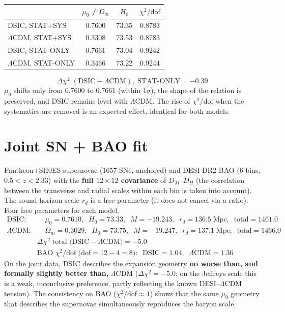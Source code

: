 \documentclass[a4paper,10pt]{article}
\begin{document}
\begin{table}[htbp]
\centering
\small
\begin{tabular}{@{}lccc@{}}
\toprule
 & $\mu_0$ / $\Omega_m$ & $H_0$ & $\chi^2/\text{dof}$ \\
\midrule
DSIC, STAT+SYS & 0.7600 & 73.35 & 0.8783 \\
$\Lambda$CDM, STAT+SYS & 0.3308 & 73.53 & 0.8783 \\
DSIC, STAT-ONLY & 0.7661 & 73.04 & 0.9242 \\
$\Lambda$CDM, STAT-ONLY & 0.3466 & 73.22 & 0.9244 \\
\bottomrule
\end{tabular}
\end{table}

\begin{equation*}
\Delta\chi^2\;(\text{DSIC} - \Lambda\text{CDM}),\;\text{STAT-ONLY} = -0.39
\end{equation*}
$\mu_0$ shifts only from 0.7600 to 0.7661 (within $1\sigma$), the shape of the relation is preserved, and DSIC remains level with $\Lambda$CDM. The rise of $\chi^2/\text{dof}$ when the systematics are removed is an expected effect, identical for both models.

\section{Joint SN + BAO fit}

Pantheon+SH0ES supernovae (1657 SNe, anchored) and DESI DR2 BAO (6 bins, $0.5 < z < 2.33$) with the \textbf{full $12{\times}12$ covariance} of $D_M$--$D_H$ (the correlation between the transverse and radial scales within each bin is taken into account). The sound-horizon scale $r_d$ is a free parameter (it does not cancel via a ratio). Four free parameters for each model.
\begin{align*}
\text{DSIC}: &\quad \mu_0 = 0.7610,\;\; H_0 = 73.33,\;\; M = -19.243,\;\; r_d = 136.5\;\text{Mpc},\;\; \text{total} = 1461.0 \\
\Lambda\text{CDM}: &\quad \Omega_m = 0.3029,\;\; H_0 = 73.75,\;\; M = -19.247,\;\; r_d = 137.1\;\text{Mpc},\;\; \text{total} = 1466.0
\end{align*}
\begin{align*}
&\Delta\chi^2\;\text{total (DSIC} - \Lambda\text{CDM}) = -5.0 \\
&\text{BAO } \chi^2/\text{dof (dof} = 12-4 = 8):\;\; \text{DSIC} = 1.04,\;\; \Lambda\text{CDM} = 1.36
\end{align*}
On the joint data, DSIC describes the expansion geometry \textbf{no worse than, and formally slightly better than,} $\Lambda$CDM ($\Delta\chi^2 = -5.0$; on the Jeffreys scale this is a weak, inconclusive preference, partly reflecting the known DESI--$\Lambda$CDM tension). The consistency on BAO ($\chi^2/\text{dof} \approx 1$) shows that the same $\mu_0$ geometry that describes the supernovae simultaneously reproduces the baryon scale.
\end{document}
